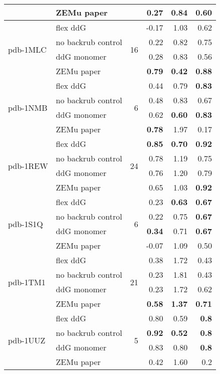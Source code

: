 {\begin{longtable}{llrrrr}
 & ZEMu paper & & 0.27 & 0.84 & 0.60  \\
\hline
 \multirow{ 4}{*}{pdb-1MLC} & flex ddG & \multirow{ 4}{*}{16} & -0.17 & 1.03 & 0.62  \\
 & no backrub control & & 0.22 & 0.82 & 0.75  \\
 & ddG monomer & & 0.28 & 0.83 & 0.56  \\
 & ZEMu paper & & \textbf{0.79} & \textbf{0.42} & \textbf{0.88}  \\
\hline
 \multirow{ 4}{*}{pdb-1NMB} & flex ddG & \multirow{ 4}{*}{6} & 0.44 & 0.79 & \textbf{0.83}  \\
 & no backrub control & & 0.48 & 0.83 & 0.67  \\
 & ddG monomer & & 0.62 & \textbf{0.60} & \textbf{0.83}  \\
 & ZEMu paper & & \textbf{0.78} & 1.97 & 0.17  \\
\hline
 \multirow{ 4}{*}{pdb-1REW} & flex ddG & \multirow{ 4}{*}{24} & \textbf{0.85} & \textbf{0.70} & \textbf{0.92}  \\
 & no backrub control & & 0.78 & 1.19 & 0.75  \\
 & ddG monomer & & 0.76 & 1.20 & 0.79  \\
 & ZEMu paper & & 0.65 & 1.03 & \textbf{0.92}  \\
\hline
 \multirow{ 4}{*}{pdb-1S1Q} & flex ddG & \multirow{ 4}{*}{6} & 0.23 & \textbf{0.63} & \textbf{0.67}  \\
 & no backrub control & & 0.22 & 0.75 & \textbf{0.67}  \\
 & ddG monomer & & \textbf{0.34} & 0.71 & \textbf{0.67}  \\
 & ZEMu paper & & -0.07 & 1.09 & 0.50  \\
\hline
 \multirow{ 4}{*}{pdb-1TM1} & flex ddG & \multirow{ 4}{*}{21} & 0.38 & 1.72 & 0.43  \\
 & no backrub control & & 0.23 & 1.81 & 0.43  \\
 & ddG monomer & & 0.23 & 1.72 & 0.62  \\
 & ZEMu paper & & \textbf{0.58} & \textbf{1.37} & \textbf{0.71}  \\
\hline
 \multirow{ 4}{*}{pdb-1UUZ} & flex ddG & \multirow{ 4}{*}{5} & 0.80 & 0.59 & \textbf{0.8}  \\
 & no backrub control & & \textbf{0.92} & \textbf{0.52} & \textbf{0.8}  \\
 & ddG monomer & & 0.83 & 0.80 & \textbf{0.8}  \\
 & ZEMu paper & & 0.42 & 1.60 & 0.2  \\

\end{longtable}}
